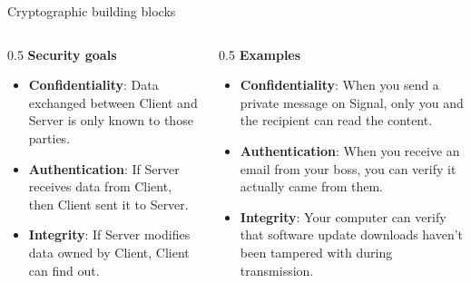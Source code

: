 \documentclass[aspectratio=169, lualatex, handout]{beamer}
\begin{document}
	\begin{frame}{Cryptographic building blocks}
		\begin{columns}[c]
			\begin{column}{0.5\textwidth}
				\textbf{Security goals}
				\begin{itemize}
					\pause

					\item \textbf{Confidentiality}: Data exchanged between Client and Server
						is only known to those parties. \pause

					\item \textbf{Authentication}: If Server receives data from Client,
						then Client sent it to Server. \pause

					\item \textbf{Integrity}: If Server modifies data owned by Client,
						Client can find out.
				\end{itemize}
			\end{column}

			\begin{column}{0.5\textwidth}
				\textbf{Examples}
				\begin{itemize}
					\pause

					\item \textbf{Confidentiality}: When you send a private message on Signal,
						only you and the recipient can read the content. \pause

					\item \textbf{Authentication}: When you receive an email from your boss,
						you can verify it actually came from them. \pause

					\item \textbf{Integrity}: Your computer can verify that software update
						downloads haven't been tampered with during transmission.
				\end{itemize}
			\end{column}
		\end{columns}
	\end{frame}
\end{document}
